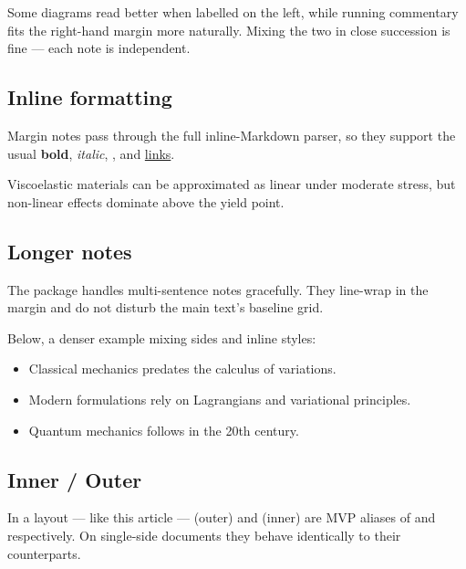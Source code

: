 \documentclass[a4paper,twoside]{article}
\begin{document}
Some diagrams read better when labelled on the left, while running commentary fits the right-hand
margin more naturally. Mixing the two in
close succession is fine --- each note is independent.
\subsection{Inline formatting}
Margin notes pass through the full inline-Markdown parser, so they support
the usual \textbf{bold}, \emph{italic}, , and \href{https://example.org}{links}.

Viscoelastic materials can be approximated as linear under moderate stress, but non-linear effects dominate above the
yield point.
\subsection{Longer notes}
The package handles multi-sentence notes gracefully. They line-wrap in the
margin and do not disturb the main text's baseline
grid.

Below, a denser example mixing sides and inline styles:
\begin{itemize}
\item Classical mechanics predates
the calculus of variations.
\item Modern formulations rely on Lagrangians and variational principles.
\item Quantum mechanics follows in the 20th century.
\end{itemize}
\subsection{Inner / Outer}
In a  layout --- like this article ---  (outer) and  (inner)
are MVP aliases of  and  respectively. On single-side documents
they behave identically to their counterparts.
\end{document}
